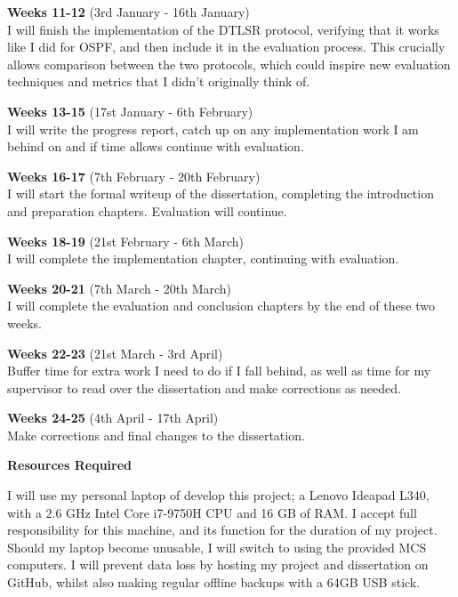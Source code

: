 \documentclass[withindex,glossary,openany]{cam-thesis}
\begin{document}
\large\textbf{Weeks 11-12} (3rd January - 16th January)\normalsize\\
I will finish the implementation of the DTLSR protocol, verifying that it works like I did for OSPF, and then include it in the evaluation process. This crucially allows comparison between the two protocols, which could inspire new evaluation techniques and metrics that I didn’t originally think of.

\large\textbf{Weeks 13-15} (17st January - 6th February)\normalsize\\
I will write the progress report, catch up on any implementation work I am behind on and if time allows continue with evaluation.

\large\textbf{Weeks 16-17} (7th February - 20th February)\normalsize\\
I will start the formal writeup of the dissertation, completing the introduction and preparation chapters. Evaluation will continue.

\large\textbf{Weeks 18-19} (21st February - 6th March)\normalsize\\
I will complete the implementation chapter, continuing with evaluation.

\large\textbf{Weeks 20-21} (7th March - 20th March)\normalsize\\
I will complete the evaluation and conclusion chapters by the end of these two weeks.

\large\textbf{Weeks 22-23} (21st March - 3rd April)\normalsize\\
Buffer time for extra work I need to do if I fall behind, as well as time for my supervisor to read over the dissertation and make corrections as needed.

\large\textbf{Weeks 24-25} (4th April - 17th April)\normalsize\\
Make corrections and final changes to the dissertation.

\vspace{8mm}
\LARGE\textbf{Resources Required}\normalsize

I will use my personal laptop of develop this project; a Lenovo Ideapad L340, with a 2.6 GHz Intel Core i7-9750H CPU and 16 GB of RAM. I accept full responsibility for this machine, and its function for the duration of my project. Should my laptop become unusable, I will switch to using the provided MCS computers. I will prevent data loss by hosting my project and dissertation on GitHub, whilst also making regular offline backups with a 64GB USB stick.
\end{document}

